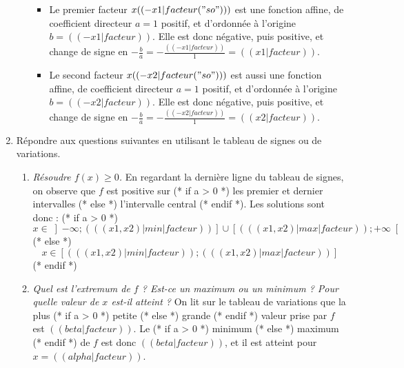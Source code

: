 \begin{enumerate}
\begin{enumerate}
\begin{itemize}
\item Le premier facteur $x (( -x1|facteur("so") ))$ est une fonction affine, de coefficient directeur $a=1$ positif, et d'ordonnée à l'origine $b=(( -x1|facteur ))$. Elle est donc négative, puis positive, et change de signe en $-\frac{b}{a}=-\frac{(( -x1|facteur ))}{1}=(( x1|facteur ))$.
\item Le second facteur $x (( -x2|facteur("so") ))$ est aussi une fonction affine, de coefficient directeur $a=1$ positif, et d'ordonnée à l'origine $b=(( -x2|facteur ))$. Elle est donc négative, puis positive, et change de signe en $-\frac{b}{a}=-\frac{(( -x2|facteur ))}{1}=(( x2|facteur ))$.
\end{itemize}
\begin{center}
\end{center}
\end{enumerate}
\item Répondre aux questions suivantes en utilisant le tableau de signes ou de variations.
\begin{enumerate}
\item \emph{Résoudre $f(x)\geq0$.} En regardant la dernière ligne du tableau de signes, on observe que $f$ est positive sur
(* if a > 0 *) les premier et dernier intervalles (* else *) l'intervalle central (* endif *).
Les solutions sont donc :
(* if a > 0 *)
   \[x\in\left]-\infty; (( (x1, x2)|min|facteur ))\right] \cup \left[ (( (x1, x2)|max|facteur )); +\infty\right[\]
(* else *)
   \[ x\in\left[ (( (x1, x2)|min|facteur )) ; (( (x1, x2)|max|facteur )) \right] \]
(* endif *)
\item \emph{Quel est l'extremum de $f$ ? Est-ce un maximum ou un minimum ? Pour quelle valeur de $x$ est-il atteint ?} On lit sur le tableau de variations que la plus
(* if a > 0 *) petite (* else *) grande (* endif *)
valeur prise par $f$ est $(( beta|facteur ))$. Le
(* if a > 0 *) minimum (* else *) maximum (* endif *)
de $f$ est donc $(( beta|facteur ))$, et il est atteint pour $x=(( alpha|facteur ))$.
\end{enumerate}
\end{enumerate}
